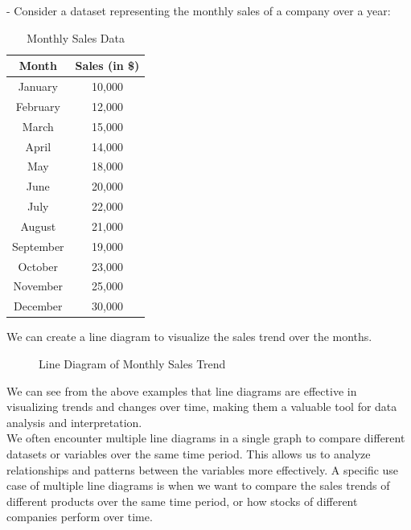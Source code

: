 \documentclass[openany]{book}
\begin{document}
\begin{example}
 - Consider a dataset representing the monthly sales of a company over a year:
\begin{table}[H]
    \centering
    \begin{tabular}{|c|c|}
        \hline
        \textbf{Month} & \textbf{Sales (in \$)} \\
        \hline
        January & 10,000 \\
        February & 12,000 \\
        March & 15,000 \\
        April & 14,000 \\
        May & 18,000 \\
        June & 20,000 \\
        July & 22,000 \\
        August & 21,000 \\
        September & 19,000 \\
        October & 23,000 \\
        November & 25,000 \\
        December & 30,000 \\
        \hline
    \end{tabular}
    \caption{Monthly Sales Data}
\end{table}
We can create a line diagram to visualize the sales trend over the months. \\
\begin{figure}[H]
    \centering
    \caption{Line Diagram of Monthly Sales Trend}
\end{figure}
\end{example}
We can see from the above examples that line diagrams are effective in visualizing trends and changes over time, making them a valuable tool for data analysis and interpretation. \\ 
We often encounter multiple line diagrams in a single graph to compare different datasets or variables over the same time period. This allows us to analyze relationships and patterns between the variables more effectively. A specific use case of multiple line diagrams is when we want to compare the sales trends of different products over the same time period, or how stocks of different companies perform over time.
\end{document}
